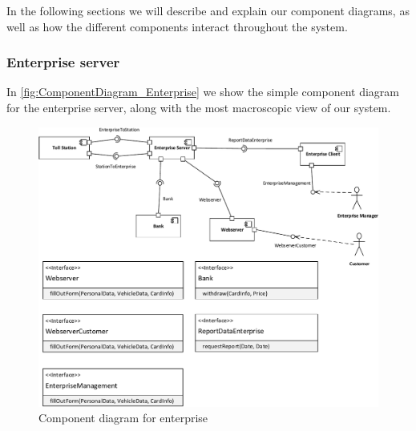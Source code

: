 
In the following sections we will describe and explain our component diagrams, as well as how the different components interact throughout the system.

\subsubsection*{Enterprise server}
In \autoref{fig:ComponentDiagram_Enterprise} we show the simple component diagram for the enterprise server, along with the most macroscopic view of our system. 
\begin{figure}[H]
\centering
\includegraphics[width=1\textwidth]{img/component_diagrams/ComponentDiagram_Enterprise}
\caption{Component diagram for enterprise}
\label{fig:ComponentDiagram_Enterprise}
\end{figure}

